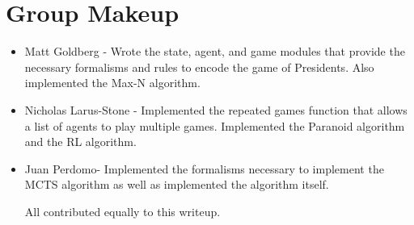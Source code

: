 \documentclass[11pt]{article}
\begin{document}
\section{Group Makeup}

\begin{itemize}
\item Matt Goldberg - Wrote the state, agent, and game modules that provide the necessary formalisms and rules to encode the game of Presidents. Also implemented the Max-N algorithm.
\item Nicholas Larus-Stone - Implemented the repeated games function that allows a list of agents to play multiple games. Implemented the Paranoid algorithm and the RL algorithm.

\item Juan Perdomo-  Implemented the formalisms necessary to implement the MCTS algorithm as well as implemented the algorithm itself.

All contributed equally to this writeup.
\end{itemize}
\end{document}
